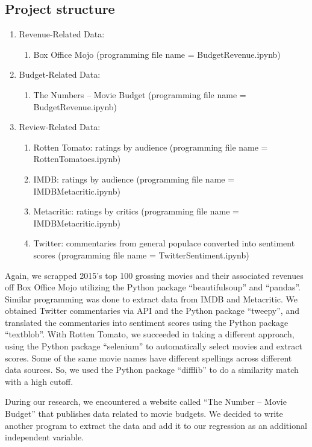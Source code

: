 \documentclass{article}
\begin{document}
\subsection{Project structure}

\begin{enumerate}
	\item	Revenue-Related Data:
	\begin{enumerate}
 		\item	Box Office Mojo (programming file name = BudgetRevenue.ipynb)
 	\end{enumerate}
	\item	Budget-Related Data:
 	\begin{enumerate}
 		\item	The Numbers – Movie Budget (programming file name = BudgetRevenue.ipynb)
 	\end{enumerate}
	\item	Review-Related Data:
 	\begin{enumerate}
 		\item	Rotten Tomato: ratings by audience (programming file name = RottenTomatoes.ipynb)
 		\item	IMDB:  ratings by audience (programming file name = IMDBMetacritic.ipynb)
 		\item	Metacritic:  ratings by critics (programming file name = IMDBMetacritic.ipynb)
 		\item	Twitter:  commentaries from general populace converted into sentiment scores (programming file name = TwitterSentiment.ipynb)
 	\end{enumerate}
\end{enumerate}

Again, we scrapped 2015’s top 100 grossing movies and their associated revenues off Box Office Mojo utilizing the Python package “beautifulsoup” and “pandas”.  Similar programming was done to extract data from IMDB and Metacritic.  We obtained Twitter commentaries via API and the Python package “tweepy”, and translated the commentaries into sentiment scores using the Python package “textblob”.  With Rotten Tomato, we succeeded in taking a different approach, using the Python package “selenium” to automatically select movies and extract scores.  Some of the same movie names have different spellings across different data sources. So, we used the Python package “difflib” to do a similarity match with a high cutoff.

During our research, we encountered a website called “The Number – Movie Budget” that publishes data related to movie budgets.  We decided to write another program to extract the data and add it to our regression as an additional independent variable.
  
\end{document}
